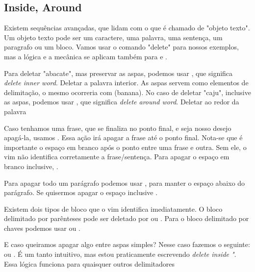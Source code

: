 \subsection{Inside, Around}
Existem sequências avançadas, que lidam com o que é chamado de "objeto texto".
Um objeto texto pode ser um caractere, uma palavra, uma sentença, um paragrafo ou um bloco.
Vamos usar o comando "delete" para nossos exemplos, mas a lógica e a mecânica se aplicam também
para  e .

Para deletar "abacate", mas preservar as aspas, podemos usar ,
que significa \textit{delete inner word}. Deletar a palavra interior.
As aspas servem como elementos de delimitação, o mesmo ocorreria com (banana).
No caso de deletar "caju", inclusive as aspas, podemos usar ,
que significa \textit{delete around word}. Deletar ao redor da palavra

Caso tenhamos uma frase, que se finaliza no ponto final,
e seja nosso desejo apagá-la, usamos .
Essa ação irá apagar a frase até o ponto final.
Nota-se que é importante o espaço em branco após o ponto entre uma frase e outra.
Sem ele, o vim não identifica corretamente a frase/sentença.
Para apagar o espaço em branco inclusive, . 

Para apagar todo um parágrafo podemos usar ,
para manter o espaço abaixo do parágrafo.
Se quisermos apagar o espaço inclusive .

Existem dois tipos de bloco que o vim identifica imediatamente.
O bloco delimitado por parênteses pode ser deletado por  ou .
Para o bloco delimitado por chaves podemos usar  ou .

E caso queiramos apagar algo entre aspas simples? Nesse caso fazemos o seguinte:
 ou .
É um tanto intuitivo, mas estou praticamente escrevendo \textit{delete inside "}.
Essa lógica funciona para quaisquer outros delimitadores

